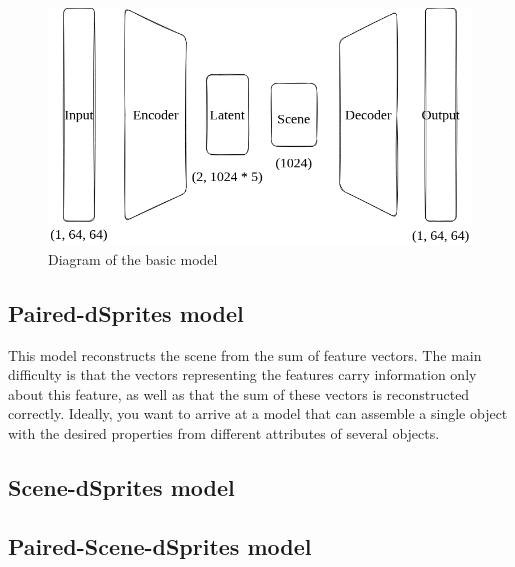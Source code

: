 \documentclass{article}
\begin{document}
    \begin{figure}
        \centering
        \includegraphics[width=0.7\linewidth]{img/model/basic_model}
        \caption{Diagram of the basic model}
        \label{fig:basic_model}

    \end{figure}

    \subsection{Paired-dSprites model}
    This model reconstructs the scene from the sum of feature vectors.
    The main difficulty is that the vectors representing the features carry
    information only about this feature, as well as that the sum of these
    vectors is reconstructed correctly. Ideally, you want to arrive at a
    model that can assemble a single object with the desired properties
    from different attributes of several objects.



    \subsection{Scene-dSprites model}

    \subsection{Paired-Scene-dSprites model}
\end{document}
